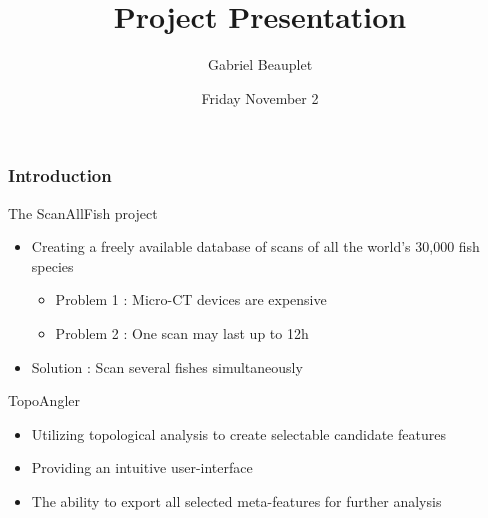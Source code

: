 \documentclass[9pt]{beamer}
\begin{document}
\title{Project Presentation}
\author[]{Gabriel Beauplet}
\date{Friday November 2} 
\maketitle

\begin{frame}
\frametitle{Introduction}
\begin{block}{The ScanAllFish project}
\begin{itemize}
\item Creating a freely available database of scans of all the world’s 30,000 fish species
\begin{itemize}
\item Problem 1 : Micro-CT devices are expensive
\item Problem 2 : One scan may last up to 12h
\end{itemize}
\item Solution : Scan several fishes simultaneously
\end{itemize}
\end{block}
\begin{block}{TopoAngler}
\begin{itemize}
\item Utilizing topological analysis to create selectable candidate features
\item Providing an intuitive user-interface
\item The ability to export all selected meta-features for further analysis
\end{itemize}
\end{block}
\end{frame}
\end{document}
